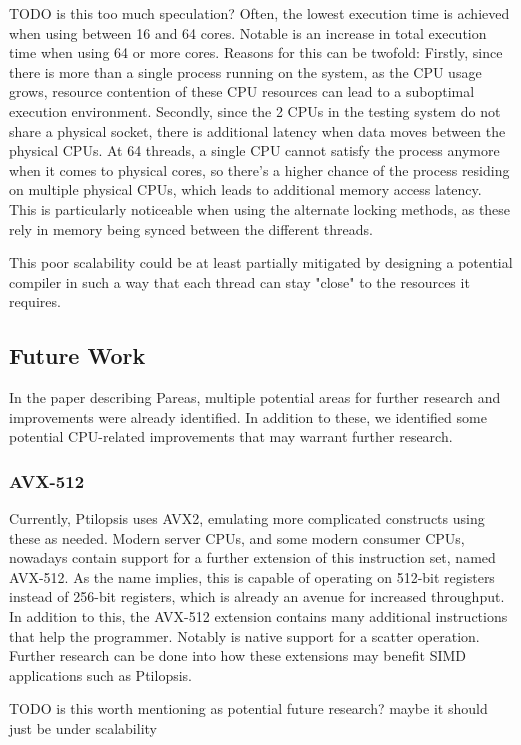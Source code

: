 \documentclass[12pt,dvipsnames]{article}
\newcommand{\helpme}[1]{{\color{red}#1}}
\begin{document}
\helpme{TODO is this too much speculation?}
Often, the lowest execution time is achieved when using between 16 and 64 cores. Notable is an increase in total execution time when using 64 or more cores. Reasons for this can be twofold: Firstly, since there is more than a single process running on the system, as the CPU usage grows, resource contention of these CPU resources can lead to a suboptimal execution environment. Secondly, since the 2 CPUs in the testing system do not share a physical socket, there is additional latency when data moves between the physical CPUs. At 64 threads, a single CPU cannot satisfy the process anymore when it comes to physical cores, so there's a higher chance of the process residing on multiple physical CPUs, which leads to additional memory access latency. This is particularly noticeable when using the alternate locking methods, as these rely in memory being synced between the different threads.

This poor scalability could be at least partially mitigated by designing a potential compiler in such a way that each thread can stay "close" to the resources it requires.

\subsection{Future Work}
In the paper describing Pareas, multiple potential areas for further research and improvements were already identified. In addition to these, we identified some potential CPU-related improvements that may warrant further research.

\subsubsection*{AVX-512} \label{avx512}
Currently, Ptilopsis uses AVX2, emulating more complicated constructs using these as needed. Modern server CPUs, and some modern consumer CPUs, nowadays contain support for a further extension of this instruction set, named AVX-512. As the name implies, this is capable of operating on 512-bit registers instead of 256-bit registers, which is already an avenue for increased throughput. In addition to this, the AVX-512 extension contains many additional instructions that help the programmer. Notably is native support for a scatter operation. Further research can be done into how these extensions may benefit SIMD applications such as Ptilopsis.

\helpme{TODO is this worth mentioning as potential future research? maybe it should just be under scalability}
\end{document}

